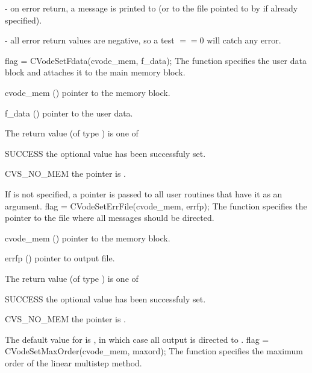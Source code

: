 - on error return, a message is printed to  (or to
the file pointed to by  if already specified).

- all error return values are negative, so a test $==0$
will catch any error.



{
  flag = CVodeSetFdata(cvode\_mem, f\_data);
}
{
  The function  specifies the user data block
  and attaches it to the main {\cvodes} memory block.
}
{
  \begin{args}
  \item[cvode\_mem] ()
    pointer to the {\cvodes} memory block.
  \item[f\_data] ()
    pointer to the user data.
  \end{args}
}
{
  The return value  (of type ) is one of
  \begin{args}
  \item[SUCCESS] 
    the optional value has been successfuly set.
  \item[CVS\_NO\_MEM]
    the  pointer is .
  \end{args}
}
{
  If  is not specified, a  pointer is
  passed to all user routines that have it as an argument.
}
{
flag = CVodeSetErrFile(cvode\_mem, errfp);
}
{
  The function  specifies the pointer to the file
  where all {\cvodes} messages should be directed.
}
{
  \begin{args}
  \item[cvode\_mem] ()
    pointer to the {\cvodes} memory block.
  \item[errfp] ()
    pointer to output file.
  \end{args}
}
{
  The return value  (of type ) is one of
  \begin{args}
  \item[SUCCESS] 
    the optional value has been successfuly set.
  \item[CVS\_NO\_MEM]
    the  pointer is .
  \end{args}
}
{
  The default value for  is , in which case
  all output is directed to .
}
{
flag = CVodeSetMaxOrder(cvode\_mem, maxord);
}
{
  The function  specifies the maximum order of the 
  linear multistep method.
}

